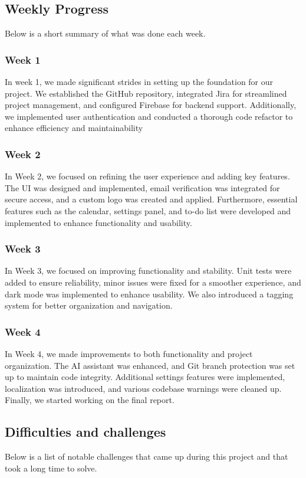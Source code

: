 \documentclass{article}
\begin{document}
\subsection{Weekly Progress}
Below is a short summary of what was done each week.

\subsubsection{Week 1}
In week 1, we made significant strides in setting up the foundation for our project.
We established the GitHub repository, integrated Jira for streamlined project management, and configured Firebase for backend support.
Additionally, we implemented user authentication and conducted a thorough code refactor to enhance efficiency and maintainability

\subsubsection{Week 2}
In Week 2, we focused on refining the user experience and adding key features.
The UI was designed and implemented, email verification was integrated for secure access, and a custom logo was created and applied.
Furthermore, essential features such as the calendar, settings panel, and to-do list were developed and implemented to enhance functionality and usability.

\subsubsection{Week 3}
In Week 3, we focused on improving functionality and stability.
Unit tests were added to ensure reliability, minor issues were fixed for a smoother experience, and dark mode was implemented to enhance usability.
We also introduced a tagging system for better organization and navigation.

\subsubsection{Week 4}
In Week 4, we made improvements to both functionality and project organization.
The AI assistant was enhanced, and Git branch protection was set up to maintain code integrity.
Additional settings features were implemented, localization was introduced, and various codebase warnings were cleaned up.
Finally, we started working on the final report.

\subsection{Difficulties and challenges}
Below is a list of notable challenges that came up during this project and that took a long time to solve.
\end{document}
